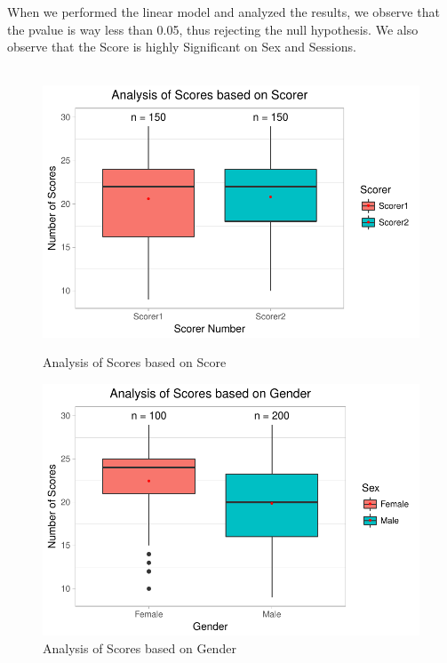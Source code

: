 \documentclass[12pt,epsf]{report}
\begin{document}
{When we performed the linear model and analyzed the results, we observe that the pvalue is way less than 0.05, thus rejecting the null hypothesis. We also observe that the Score is highly Significant on Sex and Sessions.\\
\\
\begin{figure}[!htb]
	\begin{minipage}[c]{0.5\linewidth}
	\includegraphics[width=\linewidth]{ScorerVsScore.pdf}
	\caption{Analysis of Scores based on Score }
	\end{minipage}
	\hfill
	\begin{minipage}[c]{0.5\linewidth}
	\includegraphics[width=\linewidth]{GenderVsScore.pdf}
	\caption{Analysis of Scores based on Gender}
	\end{minipage}
\end{figure}
\begin{figure}[!htb]

\end{figure}}
\end{document}
